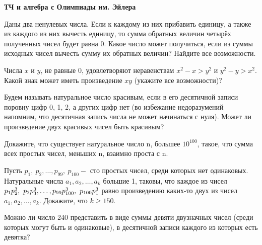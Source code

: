   \hspace{3mm}

\centerline{\bf \Huge ТЧ и алгебра с Олимпиады им. Эйлера}

\hspace{3mm}

 Даны два ненулевых числа. Если к каждому из них прибавить единицу, а также из каждого из них вычесть единицу, то сумма обратных величин четырёх полученных чисел будет равна 0. Какое число
может получиться, если из суммы исходных чисел вычесть сумму
их обратных величин? Найдите все возможности.

 Числа $x$ и $y$, не равные $0$, удовлетворяют неравенствам $x^2 - x > y^2$ и $y^2 - y  > x^2$. Какой знак может иметь произведение $xy$ (укажите все возможности)?

 Будем называть натуральное число красивым, если в его десятичной записи поровну цифр 0, 1, 2, а других цифр нет (во избежание недоразумений напомним, что десятичная запись числа не может начинаться с нуля). Может ли произведение двух красивых чисел быть красивым?

  Докажите, что существует натуральное число n, большее $10^{100}$, такое, что сумма всех
простых чисел, меньших n, взаимно проста с n.

 Пусть $p_1,\ p_2, \dotsc , p_{99},\ p_{100} -$ сто простых чисел, среди которых нет одинаковых. Натуральные числа $a_1, a_2, \dotsc, a_k$ большие 1, таковы, что каждое из чисел $p_1p_2^3, \ p_2p_3^3, \dotsc,\\ p_{99}p_{100}^3,\ p_{100}p_1^3$ равно произведению каких-то двух из
чисел $a_1, a_2, \dotsc, a_k$. Докажите, что $k\geq 150.$

 Можно ли число 240 представить в виде суммы девяти двузначных чисел (среди которых могут быть и одинаковые), в десятичной записи каждого из которых есть девятка?